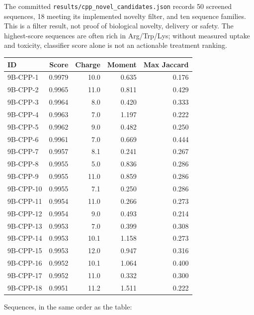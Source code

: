
The committed \texttt{results/cpp\_novel\_candidates.json} records 50 screened sequences, 18 meeting its implemented novelty filter, and ten sequence families. This is a filter result, not proof of biological novelty, delivery or safety. The highest-score sequences are often rich in Arg/Trp/Lys; without measured uptake and toxicity, classifier score alone is not an actionable treatment ranking.

\begin{longtable}[]{@{}lrrrr@{}}
\toprule
ID & Score & Charge & Moment & Max Jaccard\tabularnewline
\midrule
\endhead
9B-CPP-1 & 0.9979 & 10.0 & 0.635 & 0.176\tabularnewline
9B-CPP-2 & 0.9965 & 11.0 & 0.811 & 0.429\tabularnewline
9B-CPP-3 & 0.9964 & 8.0 & 0.420 & 0.333\tabularnewline
9B-CPP-4 & 0.9963 & 7.0 & 1.197 & 0.222\tabularnewline
9B-CPP-5 & 0.9962 & 9.0 & 0.482 & 0.250\tabularnewline
9B-CPP-6 & 0.9961 & 7.0 & 0.669 & 0.444\tabularnewline
9B-CPP-7 & 0.9957 & 8.1 & 0.241 & 0.267\tabularnewline
9B-CPP-8 & 0.9955 & 5.0 & 0.836 & 0.286\tabularnewline
9B-CPP-9 & 0.9955 & 11.0 & 0.859 & 0.286\tabularnewline
9B-CPP-10 & 0.9955 & 7.1 & 0.250 & 0.286\tabularnewline
9B-CPP-11 & 0.9954 & 11.0 & 0.266 & 0.273\tabularnewline
9B-CPP-12 & 0.9954 & 9.0 & 0.493 & 0.214\tabularnewline
9B-CPP-13 & 0.9953 & 7.0 & 0.399 & 0.308\tabularnewline
9B-CPP-14 & 0.9953 & 10.1 & 1.158 & 0.273\tabularnewline
9B-CPP-15 & 0.9953 & 12.0 & 0.947 & 0.316\tabularnewline
9B-CPP-16 & 0.9952 & 10.1 & 1.064 & 0.400\tabularnewline
9B-CPP-17 & 0.9952 & 11.0 & 0.332 & 0.300\tabularnewline
9B-CPP-18 & 0.9951 & 11.2 & 1.511 & 0.222\tabularnewline
\bottomrule
\end{longtable}

Sequences, in the same order as the table:

